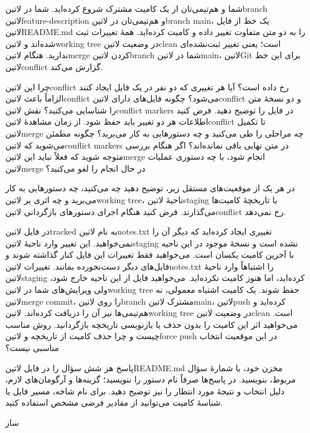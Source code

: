 \documentclass{../assignment}
\begin{document}

شما و هم‌تیمی‌تان از یک کامیت مشترک شروع کرده‌اید. شما در ‌لاتین{branch}
‌لاتین{feature-description} و هم‌تیمی‌تان در ‌لاتین{branch main}،
یک خط از فایل ‌لاتین{README.md} را به دو متن متفاوت تغییر داده و
کامیت کرده‌اید. همهٔ تغییرات ثبت شده‌اند و ‌لاتین{working tree} در وضعیت
‌لاتین{clean} است؛ یعنی تغییر ثبت‌نشده‌ای ندارید.
هنگام ‌لاتین{merge} کردن ‌لاتین{branch} شما در ‌لاتین{main}،
‌لاتین{Git} برای این خط ‌لاتین{conflict} گزارش می‌کند.

 چرا این ‌لاتین{conflict} رخ داده است؟ آیا هر تغییری که دو نفر در یک فایل
ایجاد کنند الزاماً باعث ‌لاتین{conflict} می‌شود؟
 چگونه فایل‌های دارای ‌لاتین{conflict} و دو نسخهٔ متن را شناسایی می‌کنید؟
نقش ‌لاتین{conflict markers} در فایل را توضیح دهید.
 فرض کنید اطلاعات هر دو تغییر باید حفظ شود. از زمان مشاهدهٔ ‌لاتین{conflict}
تا تکمیل ‌لاتین{merge} چه مراحلی را طی می‌کنید و چه دستورهایی به کار می‌برید؟
چگونه مطمئن می‌شوید که ‌لاتین{conflict markers} در متن نهایی باقی نمانده‌اند؟
 اگر هنگام بررسی متوجه شوید که فعلاً نباید این ‌لاتین{merge} انجام شود،
با چه دستوری عملیات ‌لاتین{merge} در حال انجام را لغو می‌کنید؟


در هر یک از موقعیت‌های مستقل زیر، توضیح دهید چه می‌کنید، چه دستورهایی
به کار می‌برید و چه اثری بر ‌لاتین{working tree}، ناحیهٔ ‌لاتین{staging} یا
تاریخچهٔ کامیت‌ها می‌گذارند. فرض کنید هنگام اجرای دستورهای بازگردانی
‌لاتین{conflict} رخ نمی‌دهد.

 در فایل ‌لاتین{tracked} به نام ‌لاتین{notes.txt} تغییری ایجاد کرده‌اید که
دیگر آن را نمی‌خواهید. این تغییر وارد ناحیهٔ ‌لاتین{staging} نشده است
و نسخهٔ موجود در این ناحیه با آخرین کامیت یکسان است. می‌خواهید فقط تغییرات
این فایل کنار گذاشته شوند و فایل‌های دیگر دست‌نخورده بمانند.
 تغییرات ‌لاتین{notes.txt} را اشتباهاً وارد ناحیهٔ
‌لاتین{staging} کرده‌اید، اما هنوز کامیت نکرده‌اید. می‌خواهید فایل از
این ناحیه خارج شود، ولی ویرایش‌های شما در ‌لاتین{working tree} حفظ شوند.
 یک کامیت اشتباه معمولی، نه ‌لاتین{merge commit}، را روی
‌لاتین{branch} مشترک ‌لاتین{main}، ‌لاتین{push} کرده‌اید و
هم‌تیمی‌ها نیز آن را دریافت کرده‌اند.
‌لاتین{working tree} در وضعیت ‌لاتین{clean} است. می‌خواهید اثر این
کامیت را بدون حذف یا بازنویسی تاریخچه بازگردانید. روش مناسب چیست و چرا حذف
کامیت از تاریخچه و ‌لاتین{force push} در این موقعیت انتخاب مناسبی نیست؟


پاسخ هر شش سؤال را در فایل ‌لاتین{README.md} مخزن خود، با شمارهٔ سؤال مربوط، بنویسید.
در پاسخ‌ها صرفاً نام دستور را ننویسید؛ گزینه‌ها و آرگومان‌های لازم،
دلیل انتخاب و نتیجهٔ مورد انتظار را نیز توضیح دهید. برای نام شاخه، مسیر
فایل یا شناسهٔ کامیت می‌توانید از مقادیر فرضی مشخص استفاده کنید.

‌ساز
\end{document}
